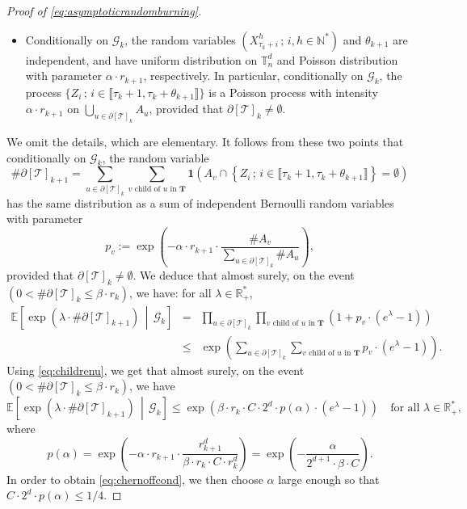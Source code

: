 \documentclass[a4paper,11pt]{article}
\begin{document}
\begin{proof}[Proof of \eqref{eq:asymptoticrandomburning}]
\begin{itemize}
\item Conditionally on $\mathcal{G}_k$, the random variables $\left(X_{\tau_k+i}^h\,;\,i,h\in\mathbb{N}^*\right)$ and $\theta_{k+1}$ are independent, and have uniform distribution on $\mathbb{T}_n^d$ and Poisson distribution with parameter $\alpha\cdot r_{k+1}$, respectively.
In particular, conditionally on $\mathcal{G}_k$, the process $\{Z_i\,;\,i\in\llbracket\tau_k+1,\tau_k+\theta_{k+1}\rrbracket\}$ is a Poisson process with intensity $\alpha\cdot r_{k+1}$ on $\bigcup_{u\in\partial[\mathcal{T}]_k}A_u$, provided that $\partial[\mathcal{T}]_k\neq\emptyset$.
\end{itemize}
We omit the details, which are elementary.
It follows from these two points that conditionally on $\mathcal{G}_k$, the random variable
\[\#\partial[\mathcal{T}]_{k+1}=\sum_{u\in\partial[\mathcal{T}]_k}\sum_{\text{$v$ child of $u$ in $\mathbf{T}$}}\mathbf{1}(A_v\cap\left\{Z_i\,;\,i\in\llbracket\tau_k+1,\tau_k+\theta_{k+1}\rrbracket\right\}=\emptyset)\]
has the same distribution as a sum of independent Bernoulli random variables with parameter
\[p_v:=\exp\left(-\alpha\cdot r_{k+1}\cdot\frac{\#A_v}{\sum_{u\in\partial[\mathcal{T}]_k}\#A_u}\right),\]
provided that $\partial[\mathcal{T}]_k\neq\emptyset$.
We deduce that almost surely, on the event $\left(0<\#\partial[\mathcal{T}]_k\leq\beta\cdot r_k\right)$, we have: for all $\lambda\in\mathbb{R}_+^*$,
\begin{eqnarray*}
\mathbb{E}\left[\exp\left(\lambda\cdot\#\partial[\mathcal{T}]_{k+1}\right)\,\middle|\,\mathcal{G}_k\right]&=&\prod_{u\in\partial[\mathcal{T}]_k}\prod_{\text{$v$ child of $u$ in $\mathbf{T}$}}\left(1+p_v\cdot\left(e^\lambda-1\right)\right)\\
&\leq&\exp\left(\sum_{u\in\partial[\mathcal{T}]_k}\sum_{\text{$v$ child of $u$ in $\mathbf{T}$}}p_v\cdot\left(e^\lambda-1\right)\right).
\end{eqnarray*}
Using \eqref{eq:childrenu}, we get that almost surely, on the event $\left(0<\#\partial[\mathcal{T}]_k\leq\beta\cdot r_k\right)$, we have
\[\mathbb{E}\left[\exp\left(\lambda\cdot\#\partial[\mathcal{T}]_{k+1}\right)\,\middle|\,\mathcal{G}_k\right]\leq\exp\left(\beta\cdot r_k\cdot C\cdot2^d\cdot p(\alpha)\cdot\left(e^\lambda-1\right)\right)\quad\text{for all $\lambda\in\mathbb{R}_+^*$,}\]
where
\[p(\alpha)=\exp\left(-\alpha\cdot r_{k+1}\cdot\frac{r_{k+1}^d}{\beta\cdot r_k\cdot C\cdot r_k^d}\right)=\exp\left(-\frac{\alpha}{2^{d+1}\cdot\beta\cdot C}\right).\]
In order to obtain \eqref{eq:chernoffcond}, we then choose $\alpha$ large enough so that ${C\cdot2^d\cdot p(\alpha)\leq1/4}$.

\end{proof}
\end{document}
